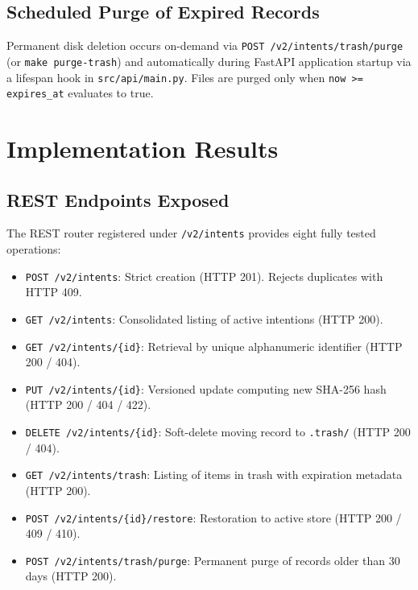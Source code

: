 \documentclass[11pt,a4paper]{article}
\begin{document}
\subsection{Scheduled Purge of Expired Records}
Permanent disk deletion occurs on-demand via \texttt{POST /v2/intents/trash/purge} (or \texttt{make purge-trash}) and automatically during FastAPI application startup via a lifespan hook in \texttt{src/api/main.py}. Files are purged only when \texttt{now >= expires\_at} evaluates to true.

\section{Implementation Results}

\subsection{REST Endpoints Exposed}
The REST router registered under \texttt{/v2/intents} provides eight fully tested operations:
\begin{itemize}[itemsep=1pt]
    \item \texttt{POST /v2/intents}: Strict creation (HTTP 201). Rejects duplicates with HTTP 409.
    \item \texttt{GET /v2/intents}: Consolidated listing of active intentions (HTTP 200).
    \item \texttt{GET /v2/intents/\{id\}}: Retrieval by unique alphanumeric identifier (HTTP 200 / 404).
    \item \texttt{PUT /v2/intents/\{id\}}: Versioned update computing new SHA-256 hash (HTTP 200 / 404 / 422).
    \item \texttt{DELETE /v2/intents/\{id\}}: Soft-delete moving record to \texttt{.trash/} (HTTP 200 / 404).
    \item \texttt{GET /v2/intents/trash}: Listing of items in trash with expiration metadata (HTTP 200).
    \item \texttt{POST /v2/intents/\{id\}/restore}: Restoration to active store (HTTP 200 / 409 / 410).
    \item \texttt{POST /v2/intents/trash/purge}: Permanent purge of records older than 30 days (HTTP 200).
\end{itemize}
\end{document}
